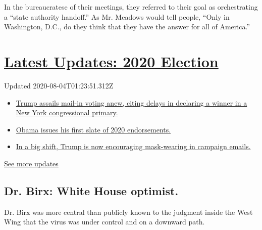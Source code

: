 In the bureaucratese of their meetings, they referred to their goal as
orchestrating a ``state authority handoff.'' As Mr. Meadows would tell
people, ``Only in Washington, D.C., do they think that they have the
answer for all of America.''

\hypertarget{latest-updates-2020-election}{%
\section{\texorpdfstring{\href{https://www.nytimes.com/2020/08/03/us/elections/biden-vs-trump.html?action=click\&pgtype=Article\&state=default\&region=MAIN_CONTENT_1\&context=storylines_live_updates}{Latest
Updates: 2020
Election}}{Latest Updates: 2020 Election}}\label{latest-updates-2020-election}}

Updated 2020-08-04T01:23:51.312Z

\begin{itemize}
\tightlist
\item
  \href{https://www.nytimes.com/2020/08/03/us/elections/biden-vs-trump.html?action=click\&pgtype=Article\&state=default\&region=MAIN_CONTENT_1\&context=storylines_live_updates\#link-6494b448}{Trump
  assails mail-in voting anew, citing delays in declaring a winner in a
  New York congressional primary.}
\item
  \href{https://www.nytimes.com/2020/08/03/us/elections/biden-vs-trump.html?action=click\&pgtype=Article\&state=default\&region=MAIN_CONTENT_1\&context=storylines_live_updates\#link-3de249e6}{Obama
  issues his first slate of 2020 endorsements.}
\item
  \href{https://www.nytimes.com/2020/08/03/us/elections/biden-vs-trump.html?action=click\&pgtype=Article\&state=default\&region=MAIN_CONTENT_1\&context=storylines_live_updates\#link-54e34d20}{In
  a big shift, Trump is now encouraging mask-wearing in campaign
  emails.}
\end{itemize}

\href{https://www.nytimes.com/2020/08/03/us/elections/biden-vs-trump.html?action=click\&pgtype=Article\&state=default\&region=MAIN_CONTENT_1\&context=storylines_live_updates}{See
more updates}

\hypertarget{dr-birx-white-house-optimist}{%
\subsection{Dr. Birx: White House
optimist.}\label{dr-birx-white-house-optimist}}

Dr. Birx was more central than publicly known to the judgment inside the
West Wing that the virus was under control and on a downward path.

